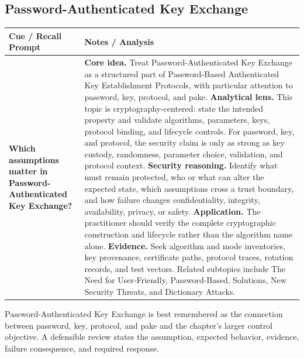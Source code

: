 \documentclass[11pt]{article}
\newcommand{\CornellHeader}{%
\rowcolor{Navy}\color{white}\bfseries Cue / Recall Prompt & \color{white}\bfseries Notes / Analysis\\\hline}
\newcommand{\CornellRow}[2]{%
\cellcolor{CueGray}\RaggedRight\textbf{#1} & \RaggedRight #2\\\hline}
\begin{document}
\subsection*{Password-Authenticated Key Exchange}
\begin{longtable}{>{\RaggedRight\arraybackslash}p{}|>{\RaggedRight\arraybackslash}p{}}
\CornellHeader
\CornellRow{Which assumptions matter in Password-Authenticated Key Exchange?}{\textbf{Core idea.} Treat Password-Authenticated Key Exchange as a structured part of Password-Based Authenticated Key Establishment Protocols, with particular attention to password, key, protocol, and pake. \textbf{Analytical lens.} This topic is cryptography-centered: state the intended property and validate algorithms, parameters, keys, protocol binding, and lifecycle controls. For password, key, and protocol, the security claim is only as strong as key custody, randomness, parameter choice, validation, and protocol context. \textbf{Security reasoning.} Identify what must remain protected, who or what can alter the expected state, which assumptions cross a trust boundary, and how failure changes confidentiality, integrity, availability, privacy, or safety. \textbf{Application.} The practitioner should verify the complete cryptographic construction and lifecycle rather than the algorithm name alone. \textbf{Evidence.} Seek algorithm and mode inventories, key provenance, certificate paths, protocol traces, rotation records, and test vectors. Related subtopics include The Need for User-Friendly, Password-Based, Solutions, New Security Threats, and Dictionary Attacks.}
\end{longtable}
\begin{topicsummary}
Password-Authenticated Key Exchange is best remembered as the connection between password, key, protocol, and pake and the chapter's larger control objective. A defensible review states the assumption, expected behavior, evidence, failure consequence, and required response.
\end{topicsummary}
\end{document}
